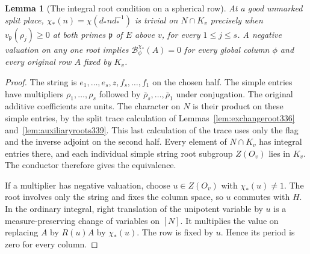 \documentclass[a4paper,11pt]{article}
\newtheorem{lemma}[proposition]{Lemma}
\theoremstyle{definition}
\theoremstyle{remark}
\numberwithin{equation}{section}
\begin{document}
\begin{lemma}[The integral root condition on a spherical row]\leavevmode\label{lem:rootvanish344}
At a good unmarked split place, $\chi_*(n)=\chi(d_*nd_*^{-1})$
is trivial on $N\cap K_v$ precisely when
$v_{\mathfrak p}(\rho_j)\ge0$ at both primes $\mathfrak p$ of
$E$ above $v$, for every $1\le j\le s$. A negative valuation on
any one root implies $\mathcal B^{\chi_*}_\phi(A)=0$ for every
global column $\phi$ and every original row $A$ fixed by $K_v$.
\end{lemma}
\begin{proof}
The string is $e_1,\ldots,e_s,z,f_s,\ldots,f_1$ on the chosen
half. The simple entries have multipliers $\rho_1,\ldots,\rho_s$
followed by $\bar\rho_s,\ldots,\bar\rho_1$ under conjugation.
The original additive coefficients are units. The character on
$N$ is their product on these simple entries, by the split trace
calculation of Lemmas~\ref{lem:exchangeroot336}
and~\ref{lem:auxiliaryroots339}. This last calculation of the trace
uses only the flag and the inverse adjoint on the second half.
Every element of $N\cap K_v$ has integral entries there, and each
individual simple string root subgroup $Z(O_v)$ lies in $K_v$.
The conductor therefore gives the equivalence.

If a multiplier has negative valuation, choose $u\in Z(O_v)$
with $\chi_*(u)\ne1$. The root involves only the string and fixes
the column space, so $u$ commutes with $H$. In the ordinary
integral, right translation of the unipotent variable by $u$ is a
measure-preserving change of variables on $[N]$. It multiplies the
value on replacing $A$ by $R(u)A$ by $\chi_*(u)$.
The row is fixed by $u$. Hence its period is zero for every column.
\end{proof}
\end{document}
